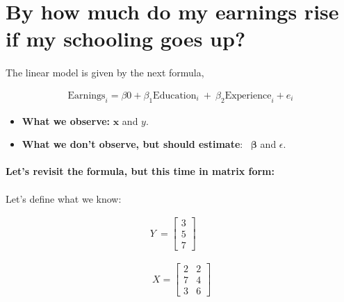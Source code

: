 \documentclass[10pt]{article}
\begin{document}
\section{By how much do my earnings rise if my schooling goes up?}

\paragraph{}The linear model is given by the next formula,



\begin{gather*}
 \text{Earnings}_{i} = \beta 0+\beta_{1}\text{Education}_{i} \ +\ \beta_{2}\text{Experience}_{i} + e_{i}
\end{gather*}





\begin{itemize}
\item \textbf{What we observe:} $\displaystyle {\boldsymbol x}$ and $\displaystyle y$. 
\item \textbf{What we don't observe, but should estimate}: \ $\displaystyle \boldsymbol{\beta} $ and $\displaystyle \epsilon $.
\end{itemize}



\paragraph{}{\Large \textbf{Let's revisit the formula, but this time in matrix form:}}



\paragraph{}Let's define what we know:


\begin{gather*}
Y\ =\begin{bmatrix}
3\\
5\\
7
\end{bmatrix}\\
\\
\\
\ X=\begin{bmatrix}
2 & 2\\
7 & 4\\
3 & 6
\end{bmatrix}
\end{gather*}
\begin{equation*}
\end{equation*}
\end{document}
